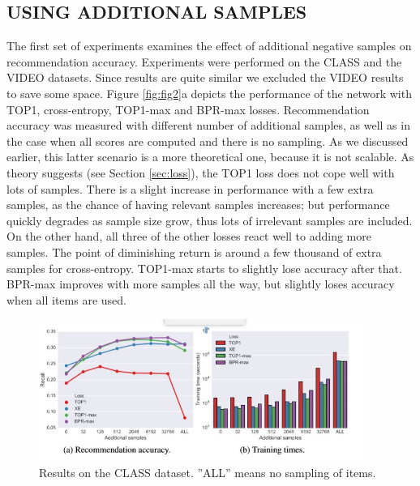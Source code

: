 \subsection{USING ADDITIONAL SAMPLES}
The first set of experiments examines the effect of additional negative samples on recommendation
accuracy. Experiments were performed on the CLASS and the VIDEO datasets. Since results are quite similar we excluded the VIDEO results to save some space. Figure \ref{fig:fig2}a depicts the performance of the network with TOP1, cross-entropy, TOP1-max and BPR-max losses. Recommendation accuracy was measured with different number of additional samples, as well as in the case when all scores are computed and there is no sampling. As we discussed earlier, this latter scenario is a more theoretical one, because it is not scalable. As theory suggests (see Section \ref{sec:loss}), the TOP1 loss does not cope well with lots of samples. There is a slight increase in performance with a few extra samples, as the chance of having relevant samples increases; but performance quickly degrades as sample size grow, thus lots of irrelevant samples are included. On the other hand, all three of the other losses react well to adding more samples. The point of diminishing return is around a few thousand of extra samples for cross-entropy. TOP1-max starts to slightly lose accuracy after that. BPR-max improves with more samples all the way, but slightly loses accuracy when all items are used.

\begin{figure}[htp]
    \centering
    \includegraphics[width=400]{img/p3.JPG}
    \caption{Results on the CLASS dataset. ”ALL” means no sampling of items.}
    \label{fig:fig3}
\end{figure}

